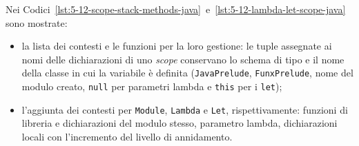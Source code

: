 \noindent Nei Codici~\ref{lst:5-12-scope-stack-methods-java}~e~\ref{lst:5-12-lambda-let-scope-java} sono mostrate:
\begin{itemize}
    \item la lista dei contesti e le funzioni per la loro gestione: le tuple assegnate ai nomi delle dichiarazioni di uno \textit{scope}
          conservano lo schema di tipo e il nome della classe in cui la variabile è definita
          (\texttt{JavaPrelude}, \texttt{FunxPrelude}, nome del modulo creato,
          \texttt{null} per parametri lambda e \texttt{this} per i \texttt{let});
    \item l'aggiunta dei contesti per \texttt{Module}, \texttt{Lambda} e \texttt{Let}, rispettivamente:
          funzioni di libreria e dichiarazioni del modulo stesso, parametro lambda,
          dichiarazioni locali con l'incremento del livello di annidamento.
\end{itemize}